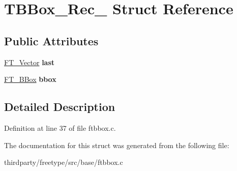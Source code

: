 \hypertarget{struct_t_b_box___rec__}{}\section{T\+B\+Box\+\_\+\+Rec\+\_\+ Struct Reference}
\label{struct_t_b_box___rec__}
\subsection*{Public Attributes}
\begin{DoxyCompactItemize}
\item 
\mbox{\label{struct_t_b_box___rec___a27057a98ea2c8980d209f7893434ea63}} 
\hyperlink{struct_f_t___vector__}{F\+T\+\_\+\+Vector} {\bfseries last}
\item 
\mbox{\label{struct_t_b_box___rec___a121fd60f108925862eebe7aa5a432820}} 
\hyperlink{struct_f_t___b_box__}{F\+T\+\_\+\+B\+Box} {\bfseries bbox}
\end{DoxyCompactItemize}


\subsection{Detailed Description}


Definition at line 37 of file ftbbox.\+c.



The documentation for this struct was generated from the following file\+:\begin{DoxyCompactItemize}
\item 
thirdparty/freetype/src/base/ftbbox.\+c\end{DoxyCompactItemize}
